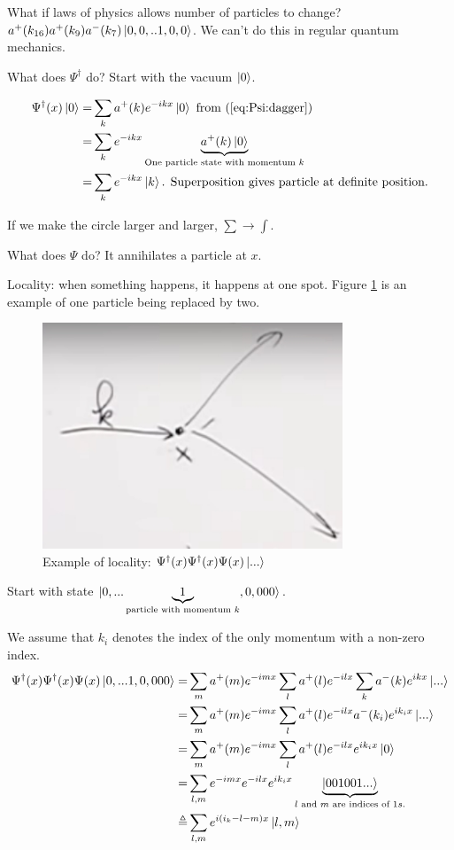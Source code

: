 \documentclass[]{article}
\begin{document}
What if laws of physics allows number of particles to change? $a^+(k_{16})a^+(k_9)a^-(k_7)\ket{0,0,..1,0,0}$. We can't do this in regular quantum mechanics.

What does $\Psi^\dagger$ do? Start with the vacuum $\ket{0}$.

\begin{align*}
\Psi^\dagger(x)\ket{0} =& \sum_k a^+(k) e^{-ikx} \ket{0} \text{ from (\ref{eq:Psi:dagger})}\\
=& \sum_k e^{-ikx} \underbrace{a^+(k) \ket{0}}_\text{One particle state with momentum $k$} \\
=& \sum_k e^{-ikx} \ket{k} \text{. Superposition gives particle at definite position.}
\end{align*}

If we make the circle larger and larger, $\sum \rightarrow \int$.

What does $\Psi$ do? It annihilates a particle at $x$.

Locality: when something happens, it happens at one spot. Figure \ref{fig:ex:locality} is an example of one particle being replaced by two.

\begin{figure}[H]
	\caption{Example of locality: $\Psi^\dagger(x)\Psi^\dagger(x)\Psi(x)\ket{...}$}\label{fig:ex:locality}
	\includegraphics[width=0.8\textwidth]{split-particle}
\end{figure}

Start with state $\ket{0,...\underbrace{1}_\text{particle with momentum $k$},0,000}$.

We assume that $k_i$ denotes the index of the only momentum with a non-zero index.
\begin{align*}
\Psi^\dagger(x)\Psi^\dagger(x)\Psi(x)\ket{0,...1,0,000}=&\sum_m a^+(m) e^{-imx} \sum_l a^+(l) e^{-ilx} \sum_k a^-(k) e^{ikx} \ket{...}\\
=&\sum_m a^+(m) e^{-imx} \sum_l a^+(l) e^{-ilx} a^-(k_i) e^{ik_ix} \ket{...}\\
=&\sum_m a^+(m) e^{-imx} \sum_l a^+(l) e^{-ilx}  e^{ik_ix} \ket{0}\\
=&\sum_{l,m}  e^{-imx}  e^{-ilx}  e^{ik_ix} \underbrace{\ket{001001...}}_\text{$l$ and $m$ are indices of $1s$.}\\
\triangleq &\sum_{l,m}   e^{i(i_k-l-m)x} \ket{l,m}
\end{align*}
\end{document}
